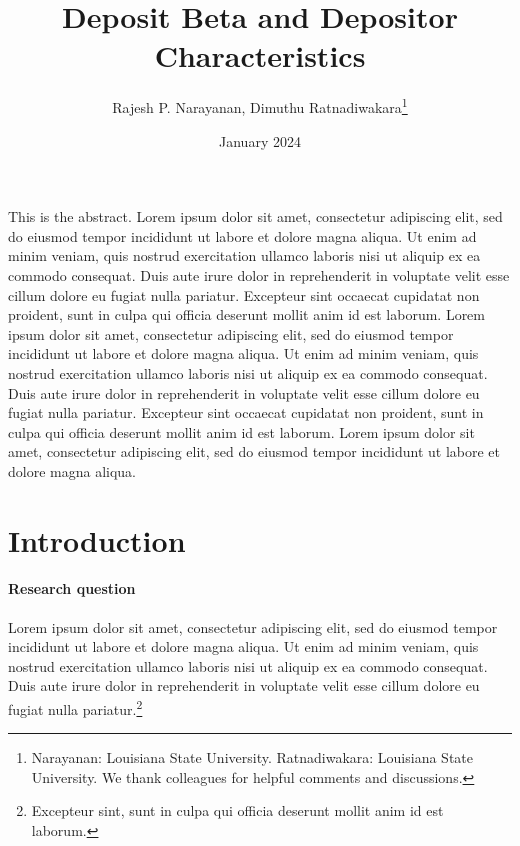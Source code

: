 \documentclass[letterpaper,12pt,leqno]{article}
\begin{document}
\title{Deposit Beta and Depositor Characteristics}
\author{Rajesh P. Narayanan, Dimuthu Ratnadiwakara\thanks{Narayanan: Louisiana State University. Ratnadiwakara: Louisiana State University. We thank colleagues for helpful comments and discussions. }}
\date{January 2024}                       
\begin{titlepage}\maketitle

This is the abstract. Lorem ipsum dolor sit amet, consectetur adipiscing elit, sed do eiusmod tempor incididunt ut labore et dolore magna aliqua. Ut enim ad minim veniam, quis nostrud exercitation ullamco laboris nisi ut aliquip ex ea commodo consequat. Duis aute irure dolor in reprehenderit in voluptate velit esse cillum dolore eu fugiat nulla pariatur. Excepteur sint occaecat cupidatat non proident, sunt in culpa qui officia deserunt mollit anim id est laborum. Lorem ipsum dolor sit amet, consectetur adipiscing elit, sed do eiusmod tempor incididunt ut labore et dolore magna aliqua. Ut enim ad minim veniam, quis nostrud exercitation ullamco laboris nisi ut aliquip ex ea commodo consequat. Duis aute irure dolor in reprehenderit in voluptate velit esse cillum dolore eu fugiat nulla pariatur. Excepteur sint occaecat cupidatat non proident, sunt in culpa qui officia deserunt mollit anim id est laborum. Lorem ipsum dolor sit amet, consectetur adipiscing elit, sed do eiusmod tempor incididunt ut labore et dolore magna aliqua.

\end{titlepage}\section{Introduction}\label{s:introduction}
 
\paragraph{Research question} Lorem ipsum dolor sit amet, consectetur adipiscing elit, sed do eiusmod tempor incididunt ut labore et dolore magna aliqua. Ut enim ad minim veniam, quis nostrud exercitation ullamco laboris nisi ut aliquip ex ea commodo consequat. Duis aute irure dolor in reprehenderit in voluptate velit esse cillum dolore eu fugiat nulla pariatur.\footnote{Excepteur sint, sunt in culpa qui officia deserunt mollit anim id est laborum.}
\end{document}
